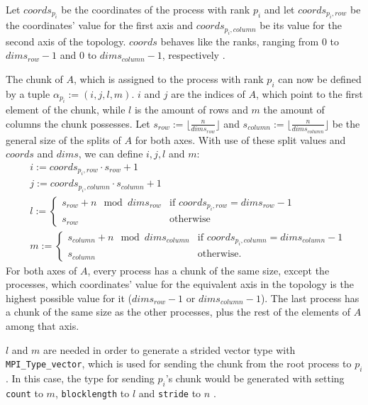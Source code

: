 \documentclass[twoside,11pt]{article}
\begin{document}
Let $coords_{p_i}$ be the coordinates of the process with
rank $p_i$ and let $coords_{p_i, row}$ be the coordinates'
value for the first axis and $coords_{p_i, column}$ be its
value for the second axis of the topology.
$coords$ behaves like the ranks, ranging from $0$ to
$dims_{row} - 1$ and $0$ to $dims_{column} - 1$,
respectively \citep[see][Chapter 7]{mpi}.

The chunk of $A$, which is assigned to the process with
rank $p_i$ can now be defined by a tuple
$\alpha_{p_i} := (i, j, l, m)$.
$i$ and $j$ are the indices of $A$, which point to the
first element of the chunk, while $l$ is the amount of rows
and $m$ the amount of columns the chunk possesses.
Let $s_{row} := \lfloor \frac{n}{dims_{row}} \rfloor$ and
$s_{column} := \lfloor \frac{n}{dims_{column}} \rfloor$ be
the general size of the splits of $A$ for both axes.
With use of these split values and $coords$ and $dims$, we
can define $i, j, l$ and $m$:
\begin{align*}
  &i := coords_{p_i,row} \cdot s_{row} + 1 \\
  &j := coords_{p_i, column} \cdot s_{column} + 1 \\
  &l := \begin{cases}
    s_{row} + n \mod dims_{row} &\text{if } coords_{p_i, row} = dims_{row} - 1 \\
    s_{row} &\text{otherwise}
  \end{cases} \\
  &m := \begin{cases}
    s_{column} + n \mod dims_{column} &\text{if } coords_{p_i, column} = dims_{column} - 1 \\
    s_{column} &\text{otherwise}.
  \end{cases}
\end{align*}
For both axes of $A$, every process has a chunk of the same
size, except the processes, which coordinates' value for
the equivalent axis in the topology is the highest possible
value for it ($dims_{row} - 1$ or $dims_{column} - 1$).
The last process has a chunk of the same size as the other
processes, plus the rest of the elements of $A$ among that
axis.


$l$ and $m$ are needed in order to generate a strided
vector type with \texttt{MPI\_Type\_vector}, which is used
for sending the chunk from the root process to $p_i$.
In this case, the type for sending $p_i$'s chunk would be
generated with setting \texttt{count} to $m$,
\texttt{blocklength} to $l$ and \texttt{stride} to $n$
\citep[see][Chapter 4]{mpi}.
\end{document}
